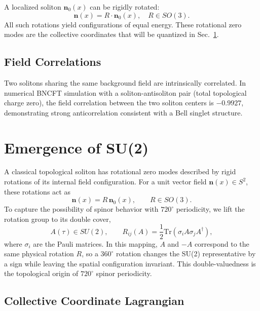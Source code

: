 ﻿\documentclass[11pt,a4paper]{article}
\begin{document}
A localized soliton $\mathbf{n}_0(x)$ can be rigidly rotated:
\begin{equation}
\mathbf{n}(x) = R \cdot \mathbf{n}_0(x), \quad R \in SO(3).
\end{equation}
All such rotations yield configurations of equal energy. These rotational zero modes are the collective coordinates that will be quantized in Sec.~\ref{sec:emergence}.

\subsection{Field Correlations}

Two solitons sharing the same background field are intrinsically correlated. In numerical BNCFT simulation with a soliton-antisoliton pair (total topological charge zero), the field correlation between the two soliton centers is $-0.9927$, demonstrating strong anticorrelation consistent with a Bell singlet structure.

\section{Emergence of SU(2)}
\label{sec:emergence}

A classical topological soliton has rotational zero modes described by rigid rotations of its internal field configuration. For a unit vector field $\mathbf{n}(x) \in S^2$, these rotations act as
\begin{equation}
\mathbf{n}(x) = R\,\mathbf{n}_0(x), \qquad R \in SO(3).
\end{equation}
To capture the possibility of spinor behavior with $720^\circ$ periodicity, we lift the rotation group to its double cover,
\begin{equation}
A(\tau) \in SU(2), \qquad R_{ij}(A) = \frac{1}{2}\text{Tr}(\sigma_i A \sigma_j A^\dagger),
\end{equation}
where $\sigma_i$ are the Pauli matrices. In this mapping, $A$ and $-A$ correspond to the same physical rotation $R$, so a $360^\circ$ rotation changes the SU(2) representative by a sign while leaving the spatial configuration invariant. This double-valuedness is the topological origin of $720^\circ$ spinor periodicity.

\subsection{Collective Coordinate Lagrangian}
\end{document}
